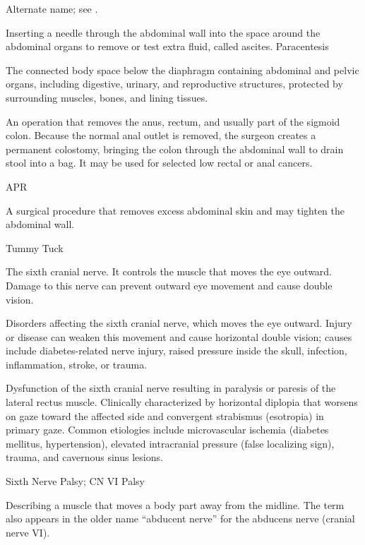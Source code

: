  Alternate name; see .

 Inserting a needle through the abdominal wall into the space around the abdominal organs to remove or test extra fluid, called ascites.
\synonyms
Paracentesis

 The connected body space below the diaphragm containing abdominal and pelvic organs, including digestive, urinary, and reproductive structures, protected by surrounding muscles, bones, and lining tissues.

 An operation that removes the anus, rectum, and usually part of the sigmoid colon. Because the normal anal outlet is removed, the surgeon creates a permanent colostomy, bringing the colon through the abdominal wall to drain stool into a bag. It may be used for selected low rectal or anal cancers.

\synonyms
APR

 A surgical procedure that removes excess abdominal skin and may tighten the abdominal wall.

\synonyms
Tummy Tuck

 The sixth cranial nerve. It controls the muscle that moves the eye outward. Damage to this nerve can prevent outward eye movement and cause double vision.

 Disorders affecting the sixth cranial nerve, which moves the eye outward. Injury or disease can weaken this movement and cause horizontal double vision; causes include diabetes-related nerve injury, raised pressure inside the skull, infection, inflammation, stroke, or trauma.

 Dysfunction of the sixth cranial nerve resulting in paralysis or paresis of the lateral rectus muscle. Clinically characterized by horizontal diplopia that worsens on gaze toward the affected side and convergent strabismus (esotropia) in primary gaze. Common etiologies include microvascular ischemia (diabetes mellitus, hypertension), elevated intracranial pressure (false localizing sign), trauma, and cavernous sinus lesions.

\synonyms
Sixth Nerve Palsy; CN VI Palsy

 Describing a muscle that moves a body part away from the midline. The term also appears in the older name “abducent nerve” for the abducens nerve (cranial nerve VI).


